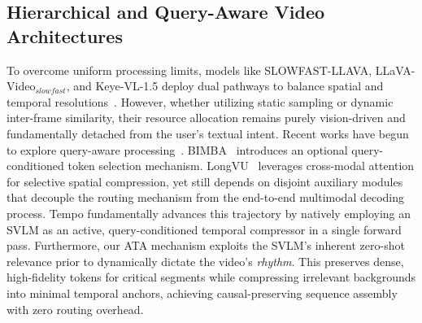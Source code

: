 \subsection{Hierarchical and Query-Aware Video Architectures}
\label{sec:related_work:query_aware}
%
To overcome uniform processing limits, models like SLOWFAST-LLAVA, LLaVA-Video$_{slowfast}$, and Keye-VL-1.5 deploy dual pathways to balance spatial and temporal resolutions~\cite{feichtenhofer2019slowfast,xu2024slowfast,zhang2024llava,yang2025kwai}. However, whether utilizing static sampling or dynamic inter-frame similarity, their resource allocation remains purely vision-driven and fundamentally detached from the user's textual intent.
%
Recent works have begun to explore query-aware processing~\cite{li2024llama,islam2025bimba,shen2024longvu}. BIMBA~\cite{islam2025bimba} introduces an optional query-conditioned token selection mechanism. LongVU~\cite{shen2024longvu} leverages cross-modal attention for selective spatial compression, yet still depends on disjoint auxiliary modules that decouple the routing mechanism from the end-to-end multimodal decoding process.
%
Tempo fundamentally advances this trajectory by natively employing an SVLM as an active, query-conditioned temporal compressor in a single forward pass. Furthermore, our ATA mechanism exploits the SVLM's inherent zero-shot relevance prior to dynamically dictate the video's \emph{rhythm}. This preserves dense, high-fidelity tokens for critical segments while compressing irrelevant backgrounds into minimal temporal anchors, achieving causal-preserving sequence assembly with zero routing overhead.
